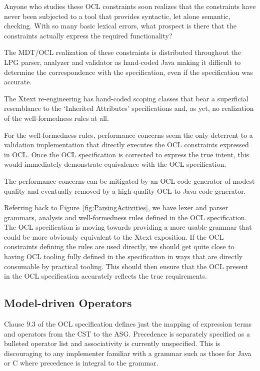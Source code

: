 \documentclass[runningheads,a4paper]{llncs}
\begin{document}
Anyone who studies these OCL constraints soon realizes that the constraints have never been subjected to a tool that provides syntactic, let alone semantic, checking. With so many basic lexical errors, what prospect is there that the constraints actually express the required functionality?

The MDT/OCL realization of these constraints is distributed throughout the LPG parser, analyzer and validator as hand-coded Java making it difficult to determine the correspondence with the specification, even if the specification was accurate.

The Xtext re-engineering has hand-coded scoping classes that bear a superficial resemblance to the `Inherited Attributes' specifications and, as yet, no realization of the well-formedness rules at all.

For the well-formedness rules, performance concerns seem the only deterrent to a validation implementation that directly executes the OCL constraints expressed in OCL. Once the OCL specification is corrected to express the true intent, this would immediately demonstrate equivalence with the OCL specification.

The performance concerns can be mitigated by an OCL code generator of modest quality and eventually removed by a high quality OCL to Java code generator.

Referring back to Figure~\ref{fig:ParsingActivities}, we have lexer and parser grammars, analysis and well-formedness rules defined in the OCL specification. The OCL specification is moving towards providing a more usable grammar that could be more obviously equivalent to the Xtext exposition. If the OCL constraints defining the rules are used directly, we should get quite close to having OCL tooling fully defined in the specification in ways that are directly consumable by practical tooling. This should then ensure that the OCL present in the OCL specification accurately reflects the true requirements.

\subsection{Model-driven Operators}

Clause 9.3 of the OCL specification defines just the mapping of expression terms and operators from the CST to the ASG. Precedence is separately specified as a bulleted operator list and associativity is currently unspecified. This is discouraging to any implementer familiar with a grammar such as those for Java or C where precedence is integral to the grammar.
\end{document}

